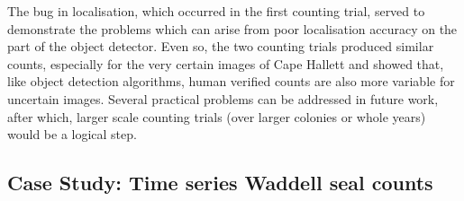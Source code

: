 The bug in localisation, which occurred in the first counting trial, served to demonstrate the problems which can arise from poor localisation accuracy on the part of the object detector. Even so, the two counting trials produced similar counts, especially for the very certain images of Cape Hallett and showed that, like object detection algorithms, human verified counts are also more variable for uncertain images. Several practical problems can be addressed in future work, after which, larger scale counting trials (over larger colonies or whole years) would be a logical step.

\subsection{Case Study: Time series Waddell seal counts}
\label{sec:case_seals}



